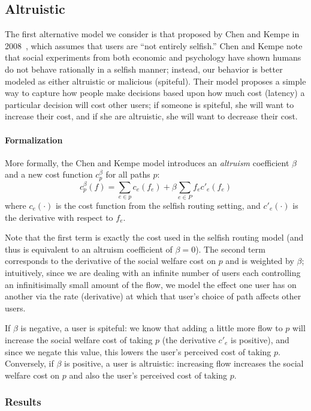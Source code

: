 \subsection{Altruistic}
The first alternative model we consider is that proposed by Chen and Kempe in 2008~\cite{chen}, which assumes that users are ``not entirely selfish.''
Chen and Kempe note that social experiments from both economic and psychology have shown humans do not behave rationally in a selfish manner; instead, our behavior is better modeled as either altruistic or malicious (spiteful).
Their model proposes a simple way to capture how people make decisions based upon how much cost (latency) a particular decision will cost other users; if someone is spiteful, she will want to increase their cost, and if she are altruistic, she will want to decrease their cost.

\paragraph{Formalization}
More formally, the Chen and Kempe model introduces an \emph{altruism} coefficient $\beta$ and a new cost function
$c^\beta_p$ for all paths $p$: 
$$c^\beta_p(f) = \sum_{e \in p} c_e(f_e) + \beta\sum_{e\in P} f_ec'_e(f_e)$$
where $c_e(\cdot)$ is the cost function from the selfish routing setting, and $c'_e(\cdot)$ is the derivative with respect to $f_e$.

Note that the first term is exactly the cost used in the selfish routing model (and thus is equivalent to an altruism coefficient of $\beta = 0$).
The second term corresponds to the derivative of the social welfare cost on $p$ and is weighted by $\beta$; intuitively, since we are dealing with an infinite number of users each controlling an infinitisimally small amount of the flow, we model the effect one user has on another 
via the rate (derivative) at which that user's choice of path affects other users.

If $\beta$ is negative, a user is spiteful: we know that adding a little more flow to $p$ will increase the social welfare cost of taking $p$ (the derivative $c'_e$ is positive), and since we negate this value, this lowers the user's perceived cost of taking $p$.
Conversely, if $\beta$ is positive, a user is altruistic: increasing flow increases the social welfare cost on $p$ and also the user's perceived cost of taking $p$.

\subsubsection{Results}
